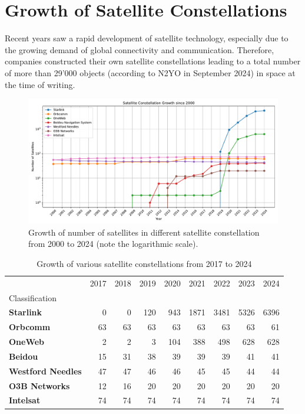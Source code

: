 \section{Growth of Satellite Constellations} \label{sec:satellite-constellations}

Recent years saw a rapid development of satellite technology, especially due to
the growing demand of global connectivity and communication. Therefore,
companies constructed their own satellite constellations leading to a total
number of more than 29'000 objects (according to N2YO in September 2024) in
space at the time of writing.

\begin{figure}[ht]
	\includegraphics[width=\textwidth]{./chapters/2-background/satellites/img/satellite-dev.pdf}
	\caption{Growth of number of satellites in different satellite constellation from 2000 to 2024 (note the logarithmic scale).}
	\label{fig:growth-satellite-constellations}
\end{figure}

\begin{table}
	\caption{Growth of various satellite constellations from 2017 to 2024}
	\label{fig:satellite-constellations-short}
	\begin{tabular}{lrrrrrrrr}
		\toprule
		                          & 2017 & 2018 & 2019 & 2020 & 2021 & 2022 & 2023 & 2024 \\
		Classification            &      &      &      &      &      &      &      &      \\
		\midrule
		\textbf{Starlink}         & 0    & 0    & 120  & 943  & 1871 & 3481 & 5326 & 6396 \\
		\textbf{Orbcomm}          & 63   & 63   & 63   & 63   & 63   & 63   & 63   & 61   \\
		\textbf{OneWeb}           & 2    & 2    & 3    & 104  & 388  & 498  & 628  & 628  \\
		\textbf{Beidou}           & 15   & 31   & 38   & 39   & 39   & 39   & 41   & 41   \\
		\textbf{Westford Needles} & 47   & 47   & 46   & 46   & 45   & 45   & 44   & 44   \\
		\textbf{O3B Networks}     & 12   & 16   & 20   & 20   & 20   & 20   & 20   & 20   \\
		\textbf{Intelsat}         & 74   & 74   & 74   & 74   & 74   & 74   & 74   & 74   \\
		\bottomrule
	\end{tabular}
\end{table}



